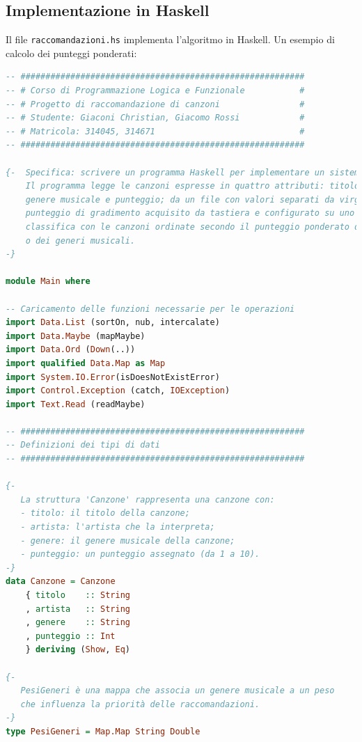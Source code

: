 \documentclass[a4paper,11pt]{article}
\begin{document}
    \subsection{Implementazione in Haskell}
    Il file \texttt{raccomandazioni.hs} implementa l'algoritmo in Haskell. Un esempio di calcolo dei punteggi ponderati:
    \begin{lstlisting}[language=Haskell]
    -- #########################################################
-- # Corso di Programmazione Logica e Funzionale           #
-- # Progetto di raccomandazione di canzoni                #
-- # Studente: Giaconi Christian, Giacomo Rossi            #
-- # Matricola: 314045, 314671                             #
-- #########################################################

{-  Specifica: scrivere un programma Haskell per implementare un sistema di raccoandazione di canzoni.
    Il programma legge le canzoni espresse in quattro attributi: titolo, artista,
    genere musicale e punteggio; da un file con valori separati da virgole, il cui nome viene acquisito da tastiera e le suggerisce all’utente basandosi sulle sue preferenze musicali, utilizzando un
    punteggio di gradimento acquisito da tastiera e configurato su uno o più generi, per creare una
    classifica con le canzoni ordinate secondo il punteggio ponderato da quello di gradimento del
    o dei generi musicali.
-}

module Main where

-- Caricamento delle funzioni necessarie per le operazioni
import Data.List (sortOn, nub, intercalate)
import Data.Maybe (mapMaybe)
import Data.Ord (Down(..))
import qualified Data.Map as Map
import System.IO.Error(isDoesNotExistError)
import Control.Exception (catch, IOException)
import Text.Read (readMaybe)

-- #########################################################
-- Definizioni dei tipi di dati
-- #########################################################

{-
   La struttura 'Canzone' rappresenta una canzone con:
   - titolo: il titolo della canzone;
   - artista: l'artista che la interpreta;
   - genere: il genere musicale della canzone;
   - punteggio: un punteggio assegnato (da 1 a 10).
-}
data Canzone = Canzone
    { titolo    :: String
    , artista   :: String
    , genere    :: String
    , punteggio :: Int
    } deriving (Show, Eq)

{-
   PesiGeneri è una mappa che associa un genere musicale a un peso
   che influenza la priorità delle raccomandazioni.
-}
type PesiGeneri = Map.Map String Double


\end{lstlisting}
\end{document}
